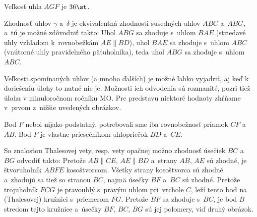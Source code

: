 {Veľkosť uhla $AGF$ je $36\st$.

\poznamky
Zhodnosť uhlov $\gamma$ a~$\delta$ je ekvivalentná zhodnosti susedných uhlov $ABC$ a~$ABG$, a~tú je možné zdôvodniť takto:
Uhol $ABG$ sa zhoduje s~uhlom $BAE$ (striedavé uhly vzhľadom k~rovnobežkám $AE\|BD$),
uhol $BAE$ sa zhoduje s~uhlom $ABC$ (vnútorné uhly pravidelného päťuholníka), teda
uhol $ABG$ sa zhoduje s~uhlom $ABC$.

Veľkosti spomínaných uhlov (a mnoho ďalších) je možné ľahko vyjadriť, aj keď k doriešeniu úlohy to nutné nie je.
Možnosti ich odvodenia sú rozmanité,
pozri tiež úlohu  v minuloročnom ročníku MO.
Pre predstavu niektoré hodnoty zhŕňame v~prvom z~nižšie uvedených obrázkov.

Bod $F$ nebol nijako podstatný, potrebovali sme iba rovnobežnosť priamok $CF$ a~$AB$.
Bod $F$ je vlastne priesečníkom uhlopriečok $BD$ a~$CE$.

So znalosťou Thalesovej vety, resp. vety opačnej možno zhodnosť úsečiek $BC$ a~$BG$ odvodiť takto:
Pretože $AB\|CE$, $AE\|BD$ a~strany $AB$, $AE$ sú zhodné, je štvoruholník $ABFE$ kosoštvorcom.
Všetky strany kosoštvorca sú zhodné a~zhodujú sa tiež so stranou $BC$,
najmä úsečky $BF$ a~$BC$ sú zhodné.
Pretože trojuholník $FCG$ je pravouhlý s~pravým uhlom pri~vrchole $C$, leží tento bod na (Thalesovej) kružnici s~priemerom $FG$.
Pretože $BF$ sa zhoduje s~$BC$, je bod $B$ stredom tejto kružnice a~úsečky $BF$, $BC$, $BG$ sú jej polomery, viď druhý obrázok.
%
}

